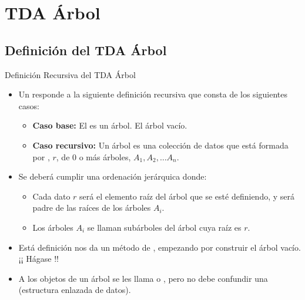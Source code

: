 \documentclass[10pt,envcountsect,spanish]{beamer}
\begin{document}
\section{TDA Árbol}



\subsection{Definición del TDA Árbol}

\begin{frame}{Definición Recursiva del TDA Árbol}

\begin{itemize}%

\item Un  \label{def:arbol} responde a la siguiente definición recursiva que consta de los siguientes casos:
\begin{itemize}
\item \textbf{Caso base:} El   es un árbol. El árbol vacío.
\item \textbf{Caso recursivo:} Un árbol es una colección de datos que está formada por , $r$,  de 0 o más árboles, $A_1, A_2, \ldots A_n$.
\end{itemize}

\item  Se deberá  cumplir una ordenación jerárquica donde:
\begin{itemize}
\item Cada dato $r$ será el elemento raíz del árbol que se esté definiendo, y será padre de las raíces de los árboles $A_i$. 
\item Los árboles $A_i$ se llaman subárboles del árbol cuya raíz es $r$.
\end{itemize}



\item Está definición nos da un método de , empezando por construir el árbol vacío. ¡¡ Hágase !!

\item A los objetos de un árbol se les llama  o , pero no debe confundir una  (estructura enlazada de datos). 

\end{itemize}
\end{frame}
\end{document}
